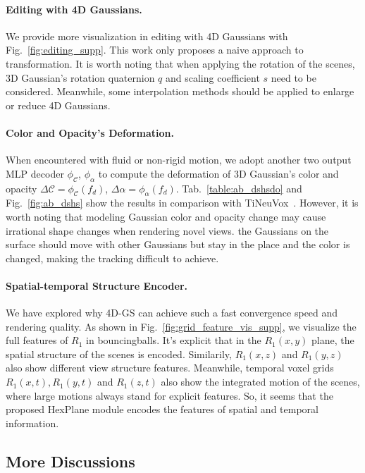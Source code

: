 \paragraph{Editing with 4D Gaussians.}
We provide more visualization in editing with 4D Gaussians with Fig.~\ref{fig:editing_supp}.  This work only proposes a naive approach to transformation. It is worth noting that when applying the rotation of the scenes, 3D Gaussian's rotation quaternion $q$ and scaling coefficient $s$ need to be considered. Meanwhile, some interpolation methods should be applied to enlarge or reduce 4D Gaussians.
\paragraph{Color and Opacity's Deformation.}
When encountered with fluid or non-rigid motion, we adopt another two output MLP decoder $\phi_{\mathcal{C}}$, $\phi_\alpha$ to compute the deformation of 3D Gaussian's color and opacity $\Delta \mathcal{C} = \phi_{\mathcal{C}}(f_d)$, $\Delta \alpha = \phi_{\mathcal{\alpha}}(f_d)$. Tab.~\ref{table:ab_dshsdo} and Fig.~\ref{fig:ab_dshs} show the results in comparison with TiNeuVox~\cite{tineuvox}. However, it is worth noting that modeling Gaussian color and opacity change may cause irrational shape changes when rendering novel views. \ie the Gaussians on the surface should move with other Gaussians but stay in the place and the color is changed, making the tracking difficult to achieve.
\paragraph{Spatial-temporal Structure Encoder.}
We have explored why 4D-GS can achieve such a fast convergence speed and rendering quality. As shown in Fig.~\ref{fig:grid_feature_vis_supp}, we visualize the full features of $R_1$ in bouncingballs. It's explicit that in the $R_1(x,y)$ plane, the spatial structure of the scenes is encoded. Similarily, $R_1(x,z)$ and $R_1(y,z)$ also show different view structure features. Meanwhile, temporal voxel grids $R_1(x,t),R_1(y,t)$ and $R_1(z,t)$ also show the integrated motion of the scenes, where large motions always stand for explicit features. So, it seems that the proposed HexPlane module encodes the features of spatial and temporal information.


\subsection{More Discussions}
\label{supsec:discussions}
